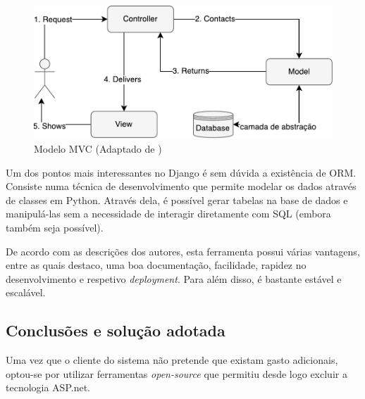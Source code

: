 \begin{figure}[!htb]
	\centering
	\includegraphics[scale=0.7]{esquemas/MVC-diagram.pdf}
	\caption[]{Modelo \ac{MVC} (Adaptado de \cite{Sugrue2013})}
	\label{mvcdiag}
\end{figure}


Um dos pontos mais interessantes no Django é sem dúvida a existência de \linebreak \ac{ORM}. Consiste numa técnica de desenvolvimento que permite modelar os dados através de classes em Python. Através dela, é possível gerar tabelas na base de dados e manipulá-las sem a necessidade de interagir diretamente com \ac{SQL} (embora também seja possível).

De acordo com as descrições dos autores, esta ferramenta possui várias vantagens, entre as quais destaco, uma boa documentação, facilidade, rapidez no desenvolvimento e respetivo \textit{deployment}. Para além disso, é bastante estável e escalável\cite{Index}. 











\subsection{Conclusões e solução adotada}



Uma vez que o cliente do sistema não pretende que existam gasto adicionais, optou-se por utilizar ferramentas \textit{open-source} que permitiu desde logo excluir a tecnologia ASP.net. 


